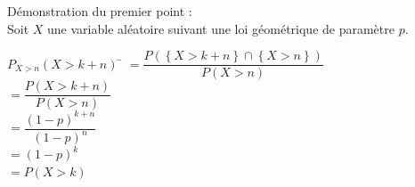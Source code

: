 \documentclass[a4paper,11pt,cours]{nsi} %
\begin{document}
\begin{demonstration}
    Démonstration du premier point :\\
    Soit $X$ une variable aléatoire suivant une loi géométrique de paramètre $p$.
        \begin{tabbing}
            $P_{X>n}(X>k+n)$    \=  $=\dfrac{P\left(\left\{X>k+n\right\}\cap \left\{X>n\right\}\right)}{P(X>n)}$\\[.5em]
            \>  $=\dfrac{P(X>k+n)}{P(X>n)}$\\[.5em]
            \>  $=\dfrac{(1-p)^{k+n}}{(1-p)^n}$\\[.5em]
            \>  $=(1-p)^k$\\[.5em]
            \>  $=P(X>k)$
        \end{tabbing}
\end{demonstration}
\end{document}
